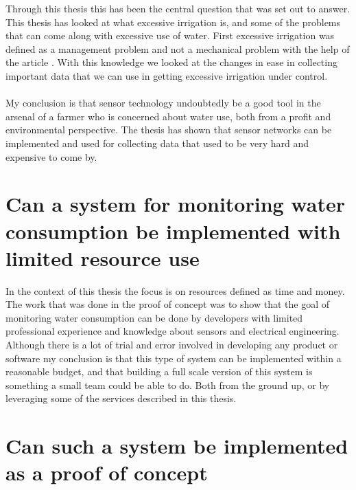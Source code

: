 \documentclass[]{uiophd}
\begin{document}
Through this thesis this has been the central question that was set out to answer. This thesis has looked at what excessive irrigation is, and some of the problems that can come along with excessive use of water. First excessive irrigation was defined as a management problem and not a mechanical problem with the help of the article \cite{LILIENFELD200773}. With this knowledge we looked at the changes in ease in collecting important data that we can use in getting excessive irrigation under control. 
\\\\
My conclusion is that sensor technology undoubtedly be a good tool in the arsenal of a farmer who is concerned about water use, both from a profit and environmental perspective. The thesis has shown that sensor networks can be implemented and used for collecting data that used to be very hard and expensive to come by.

\section{ Can a system for monitoring water consumption be implemented with limited resource use}

In the context of this thesis the focus is on resources defined as time and money. The work that was done in the proof of concept was to show that the goal of monitoring water consumption can be done by developers with limited professional experience and knowledge about sensors and electrical engineering. Although there is a lot of trial and error involved in developing any product or software my conclusion is that this type of system can be implemented within a reasonable budget, and that building a full scale version of this system is something a small team could be able to do. Both from the ground up, or by leveraging some of the services described in this thesis.

\section{ Can such a system be implemented as a proof of concept}
\end{document}
